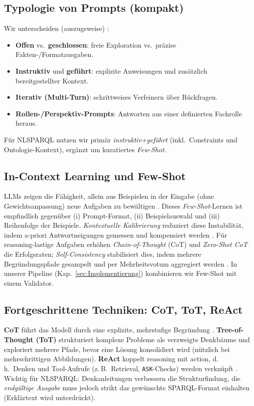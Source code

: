 \subsection{Typologie von Prompts (kompakt)}
Wir unterscheiden (auszugsweise) \cite{campesatoLLMIntro,tabatabaianPromptBook}:
\begin{itemize}
  \item \textbf{Offen} vs.\ \textbf{geschlossen}: freie Exploration vs.\ präzise Fakten-/Formatausgaben.
  \item \textbf{Instruktiv} und \textbf{geführt}: explizite Anweisungen und zusätzlich bereitgestellter Kontext.
  \item \textbf{Iterativ (Multi-Turn)}: schrittweises Verfeinern über Rückfragen.
  \item \textbf{Rollen-/Perspektiv-Prompts}: Antworten aus einer definierten Fachrolle heraus.
\end{itemize}
Für NL{\textrightarrow}SPARQL nutzen wir primär \emph{instruktiv+geführt} (inkl.\ Constraints und Ontologie-Kontext), ergänzt um kuratiertes \emph{Few-Shot}.

\subsection{In-Context Learning und Few-Shot}
LLMs zeigen die Fähigkeit, allein aus Beispielen in der Eingabe (ohne Gewichtsanpassung) neue Aufgaben zu bewältigen \cite{brown2020language}. Dieses \emph{Few-Shot}-Lernen ist empfindlich gegenüber (i) Prompt-Format, (ii) Beispielauswahl und (iii) Reihenfolge der Beispiele. \emph{Kontextuelle Kalibrierung} reduziert diese Instabilität, indem a-priori Antwortneigungen gemessen und kompensiert werden \cite{zhao2021calibrate}. Für reasoning-lastige Aufgaben erhöhen \emph{Chain-of-Thought} (CoT) \cite{wei2022cot} und \emph{Zero-Shot CoT} \cite{kojima2022zshot} die Erfolgsraten; \emph{Self-Consistency} stabilisiert dies, indem mehrere Begründungspfade gesampelt und per Mehrheitsvotum aggregiert werden \cite{wang2023selfconsistency}. In unserer Pipeline (Kap.~\ref{sec:Implementierung}) kombinieren wir Few-Shot mit einem Validator.

\subsection{Fortgeschrittene Techniken: CoT, ToT, ReAct}
\textbf{CoT} führt das Modell durch eine explizite, mehrstufige Begründung \cite{wei2022cot}. 
\textbf{Tree-of-Thought (ToT)} strukturiert komplexe Probleme als verzweigte Denkbäume und exploriert mehrere Pfade, bevor eine Lösung konsolidiert wird (nützlich bei mehrschrittigen Abbildungen). 
\textbf{ReAct} koppelt reasoning mit action, d.\,h.\ Denken und Tool-Aufrufe (z.\,B.\ Retrieval, \texttt{ASK}-Checks) werden verknüpft \cite{yao2022react}. 
Wichtig für NL{\textrightarrow}SPARQL: Denkanleitungen verbessern die Strukturfindung, die \emph{endgültige Ausgabe} muss jedoch strikt das gewünschte SPARQL-Format einhalten (Erklärtext wird unterdrückt).

